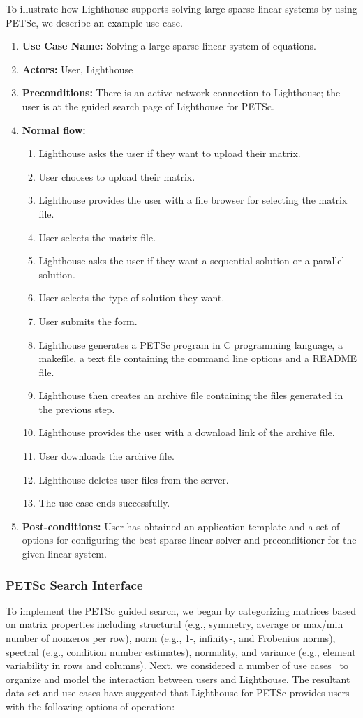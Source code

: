 \documentclass{sig-alternate}
\newcommand{\zapspace}{\topsep=0pt\partopsep=0pt\itemsep=0pt\parskip=0pt}
\begin{document}
To illustrate how Lighthouse supports solving large sparse linear systems by using PETSc, we describe an example use case.
\begin{enumerate}\zapspace
\item \textbf{Use Case Name:} Solving a large sparse linear system of equations. 
\item \textbf{Actors:} User, Lighthouse
\item \textbf{Preconditions:} There is an active network connection to Lighthouse; the user is at the guided search page of Lighthouse for PETSc.
\item \textbf{Normal flow:}
    \begin{enumerate}
        \item Lighthouse asks the user if they want to upload their matrix.
	\item User chooses to upload their matrix.
	\item Lighthouse provides the user with a file browser for selecting the matrix file.
	\item User selects the matrix file.
	\item Lighthouse asks the user if they want a sequential solution or a parallel solution.
	\item User selects the type of solution they want.
	\item User submits the form.
	\item Lighthouse generates a PETSc program in C programming language, a makefile, a text file containing the command line options and a README file.
	\item Lighthouse then creates an archive file containing the files generated in the previous step.
	\item Lighthouse provides the user with a download link of the archive file.
	\item User downloads the archive file.
	\item Lighthouse deletes user files from the server.
        \item The use case ends successfully.
    \end{enumerate}
\item \textbf{Post-conditions:} User has obtained an application template and a set of options for configuring the best sparse linear solver and preconditioner for the given linear system.
\end{enumerate}
\subsubsection{PETSc Search Interface}
To implement the
PETSc guided search, we began by categorizing matrices based on matrix properties including structural (e.g., symmetry, average or max/min number
of nonzeros per row), norm (e.g., 1-, infinity-, and Frobenius norms), spectral (e.g., condition number estimates), normality, and
variance (e.g., element variability in rows and columns). 
Next, we considered a number of use cases~\cite{uml:Online} to organize and model the interaction
between users and Lighthouse. The resultant data set and use cases have suggested that Lighthouse for PETSc provides users with
the following options of operation:
\end{document}
